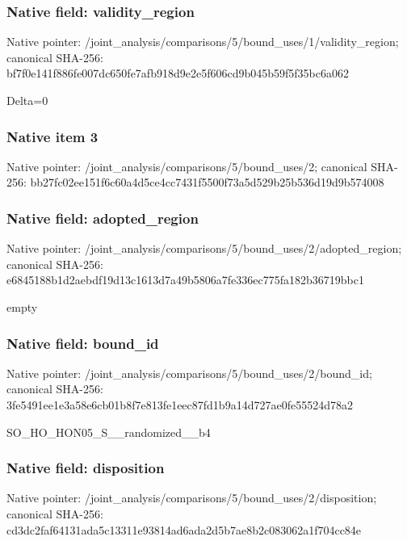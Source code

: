 \documentclass[10pt,a4paper]{article}
\begin{document}
\subsubsection{Native field: validity\_\allowbreak{}region}
Native pointer: /joint\_\allowbreak{}analysis/comparisons/5/bound\_\allowbreak{}uses/1/validity\_\allowbreak{}region; canonical SHA-256: bf7f0e141f886fe007dc650fe7afb918d9e2e5f606cd9b045b59f5f35bc6a062

\begingroup\raggedright\sloppy Delta=\allowbreak{}0\par\endgroup

\subsubsection{Native item 3}
Native pointer: /joint\_\allowbreak{}analysis/comparisons/5/bound\_\allowbreak{}uses/2; canonical SHA-256: bb27fc02ee151f6c60a4d5ce4cc7431f5500f73a5d529b25b536d19d9b574008

\subsubsection{Native field: adopted\_\allowbreak{}region}
Native pointer: /joint\_\allowbreak{}analysis/comparisons/5/bound\_\allowbreak{}uses/2/adopted\_\allowbreak{}region; canonical SHA-256: e6845188b1d2aebdf19d13c1613d7a49b5806a7fe336ec775fa182b36719bbc1

\begingroup\raggedright\sloppy empty\par\endgroup

\subsubsection{Native field: bound\_\allowbreak{}id}
Native pointer: /joint\_\allowbreak{}analysis/comparisons/5/bound\_\allowbreak{}uses/2/bound\_\allowbreak{}id; canonical SHA-256: 3fe5491ee1e3a58e6cb01b8f7e813fe1eec87fd1b9a14d727ae0fe55524d78a2

\begingroup\raggedright\sloppy SO\_\allowbreak{}HO\_\allowbreak{}HON05\_\allowbreak{}S\_\allowbreak{}\_\allowbreak{}randomized\_\allowbreak{}\_\allowbreak{}b4\par\endgroup

\subsubsection{Native field: disposition}
Native pointer: /joint\_\allowbreak{}analysis/comparisons/5/bound\_\allowbreak{}uses/2/disposition; canonical SHA-256: cd3dc2faf64131ada5c13311e93814ad6ada2d5b7ae8b2c083062a1f704cc84e
\end{document}
